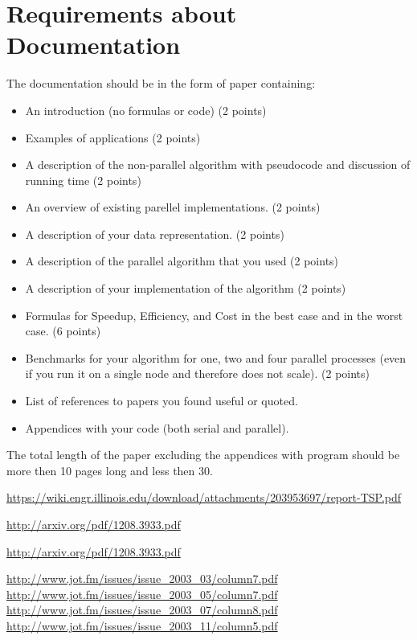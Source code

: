 \documentclass[12pt]{article}
\begin{document}
\section{Requirements about Documentation}

The documentation should be in the form of paper containing:

\begin{itemize}
\item An introduction (no formulas or code) (2 points)
\item Examples of applications (2 points)
\item A description of the non-parallel algorithm with pseudocode and
  discussion of running time (2 points)
\item An overview of existing parellel implementations. (2 points)
\item A description of your data representation. (2 points)
\item A description of the parallel algorithm that you used (2 points)
\item A description of your implementation of the algorithm (2 points)
\item Formulas for Speedup, Efficiency, and Cost in the best case and
  in the worst case. (6 points)
\item Benchmarks for your algorithm for one, two and four parallel
  processes (even if you run it on a single node and therefore does
  not scale). (2 points)
\item List of references to papers you found useful or quoted.
\item Appendices with your code (both serial and parallel).
\end{itemize}

The total length of the paper excluding the appendices with program
should be more then 10 pages long and less then 30.

\begin{thebibliography}{999}

\url{https://wiki.engr.illinois.edu/download/attachments/203953697/report-TSP.pdf}

\url{http://arxiv.org/pdf/1208.3933.pdf}

\url{http://arxiv.org/pdf/1208.3933.pdf}

\url{http://www.jot.fm/issues/issue_2003_03/column7.pdf}
\url{http://www.jot.fm/issues/issue_2003_05/column7.pdf}
\url{http://www.jot.fm/issues/issue_2003_07/column8.pdf}
\url{http://www.jot.fm/issues/issue_2003_11/column5.pdf}
\end{thebibliography}
\end{document}
